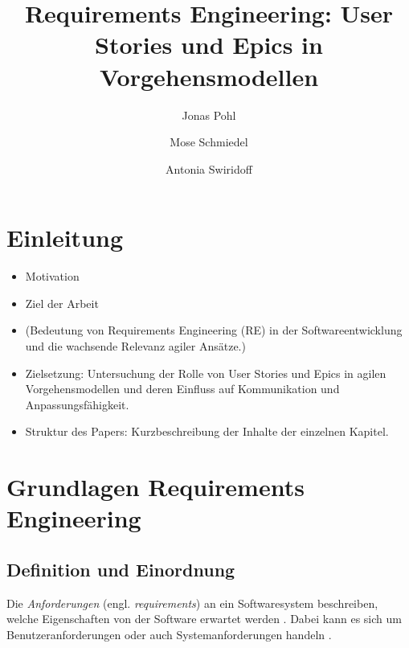 \documentclass[acmtog]{acmart}
\begin{document}
\hypersetup{
	colorlinks,
	allcolors=blue,
	citecolor=.,
}

\title{Requirements Engineering: User Stories und Epics in Vorgehensmodellen}

\author{Jonas Pohl}
\author{Mose Schmiedel}
\authornotemark[1]
\author{Antonia Swiridoff}
\authornotemark[1]

\renewcommand{\shortauthors}{Pohl, Schmiedel and Swiridoff}


\begin{abstract}
\end{abstract}

\maketitle


\section{Einleitung}

\begin{itemize}
	\item Motivation
	\item Ziel der Arbeit
	\item (Bedeutung von Requirements Engineering (RE) in der Softwareentwicklung und die wachsende Relevanz agiler Ansätze.)
	\item Zielsetzung: Untersuchung der Rolle von User Stories und Epics in agilen Vorgehensmodellen und deren Einfluss auf Kommunikation und Anpassungsfähigkeit.
	\item Struktur des Papers: Kurzbeschreibung der Inhalte der einzelnen Kapitel.
\end{itemize}

\section{Grundlagen Requirements Engineering}

\subsection{Definition und Einordnung}
Die \emph{Anforderungen} (engl. \textit{requirements}) an ein Softwaresystem beschreiben, welche Eigenschaften von der Software erwartet werden \cite{sommerville16}. Dabei kann es sich um Benutzeranforderungen oder auch Systemanforderungen handeln \cite{sommerville16}.
\end{document}
